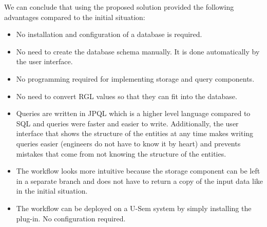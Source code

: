 We can conclude that using the proposed solution provided the following advantages compared to the initial situation:

\begin{itemize}
	\item No installation and configuration of a database is required.
	\item No need to create the database schema manually. It is done automatically by the user interface.
	\item No programming required for implementing storage and query components.
	\item No need to convert RGL values so that they can fit into the database.
	\item Queries are written in JPQL which is a higher level language compared to SQL and queries were faster and easier to write. Additionally, the user interface that shows the structure of the entities at any time makes writing queries easier (engineers do not have to know it by heart) and prevents mistakes that come from not knowing the structure of the entities. 
	\item The workflow looks more intuitive because the storage component can be left in a separate branch and does not have to return a copy of the input data like in the initial situation.
	\item The workflow can be deployed on a U-Sem system by simply installing the plug-in. No configuration required.
\end{itemize}
